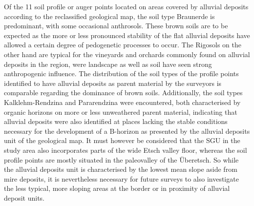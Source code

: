 \documentclass[preprint,12pt,authoryear]{elsarticle}
\begin{document}
Of the 11 soil profile or auger points located on areas covered by alluvial deposits according to the reclassified geological map, the soil type Braunerde is predominant, with some occasional anthrosols. These brown soils are to be expected as the more or less pronounced stability of the flat alluvial deposits have allowed a certain degree of pedogenetic processes to occur. The Rigosols on the other hand are typical for the vineyards and orchards commonly found on alluvial deposits in the region, were landscape as well as soil have seen strong anthropogenic influence. The distribution of the soil types of the profile points identified to have alluvial deposits as parent material by the surveyors is comparable regarding the dominance of brown soils. Additionally, the soil types Kalklehm-Rendzina and Pararendzina were encountered, both characterised by organic horizons on more or less unweathered parent material, indicating that alluvial deposits were also identified at places lacking the stable conditions necessary for the development of a B-horizon as presented by the alluvial deposits unit of the geological map. It must however be considered that the SGU in the study area also incorporates parts of the wide Etsch valley floor, whereas the soil profile points are mostly situated in the paleovalley of the {\"U}beretsch. So while the alluvial deposits unit is characterised by the lowest mean slope aside from mire deposits, it is nevertheless necessary for future surveys to also investigate the less typical, more sloping areas at the border or in proximity of alluvial deposit units.
\end{document}
